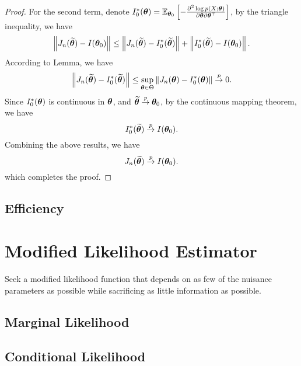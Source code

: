 \begin{proof}
	For the second term, denote $I_{0}^{*}(\boldsymbol{\theta})={\mathbb E}_{\boldsymbol{\theta}_{0}}\left[-\frac{\partial^{2}\log p(X;\boldsymbol{\theta})}{\partial\boldsymbol{\theta}\partial\boldsymbol{\theta}^{\top}}\right]$, by the triangle inequality, we have
	\begin{equation*}
		\left\|J_{n}(\widetilde{\boldsymbol{\theta}})-I(\boldsymbol{\theta}_{0})\right\|\leq\left\|J_{n}(\widetilde{\boldsymbol{\theta}})-I_{0}^{*}(\widetilde{\boldsymbol{\theta}})\right\|+\left\|I_{0}^{*}(\widetilde{\boldsymbol{\theta}})-I(\boldsymbol{\theta}_{0})\right\|.
	\end{equation*}
	According to Lemma, we have
	\begin{equation*}
		\left\|J_{n}(\widetilde{\boldsymbol{\theta}})-I_{0}^{*}(\widetilde{\boldsymbol{\theta}})\right\|\leq\sup_{\boldsymbol{\theta}\in\Theta}\left\|J_{n}(\boldsymbol{\theta})-I_{0}^{*}(\boldsymbol{\theta})\right\|\stackrel{p}{\rightarrow}0.
	\end{equation*}
	Since $I_{0}^{*}(\boldsymbol{\theta})$ is continuous in $\boldsymbol{\theta}$, and $\widetilde{\boldsymbol{\theta}}\stackrel{p}{\rightarrow}\boldsymbol{\theta}_{0}$, by the continuous mapping theorem, we have
	\begin{equation*}
		I_{0}^{*}(\widetilde{\boldsymbol{\theta}})\stackrel{p}{\rightarrow}I(\boldsymbol{\theta}_{0}).
	\end{equation*}
	Combining the above results, we have
	\begin{equation*}
		J_{n}(\widetilde{\boldsymbol{\theta}})\stackrel{p}{\rightarrow}I(\boldsymbol{\theta}_{0}).
	\end{equation*}
	which completes the proof.
\end{proof}

\subsection{Efficiency}

\section{Modified Likelihood Estimator}

Seek a modified likelihood function that depends on as few of the nuisance parameters as possible while sacrificing as little information as possible.

\subsection{Marginal Likelihood}

\subsection{Conditional Likelihood}

